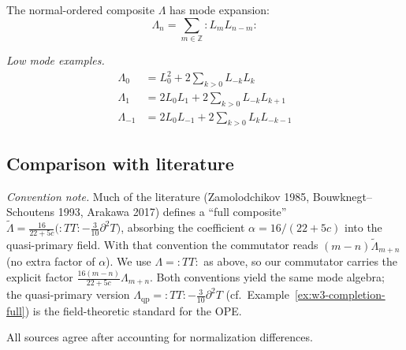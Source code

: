 The normal-ordered composite $\Lambda$ has mode expansion:
\[\Lambda_n = \sum_{m \in \mathbb{Z}} :L_m L_{n-m}:\]

\emph{Low mode examples.}
\begin{align}
\Lambda_0 &= L_0^2 + 2\sum_{k>0} L_{-k}L_k \\
\Lambda_1 &= 2L_0 L_1 + 2\sum_{k>0} L_{-k}L_{k+1} \\
\Lambda_{-1} &= 2L_0 L_{-1} + 2\sum_{k>0} L_k L_{-k-1}
\end{align}

\subsection{Comparison with literature}

\emph{Convention note.} Much of the literature (Zamolodchikov 1985, Bouwknegt--Schoutens 1993, Arakawa 2017) defines a ``full composite'' $\widetilde{\Lambda} = \frac{16}{22+5c}\bigl({:}TT{:} - \frac{3}{10}\partial^2 T\bigr)$, absorbing the coefficient $\alpha = 16/(22+5c)$ into the quasi-primary field. With that convention the commutator reads $(m-n)\widetilde{\Lambda}_{m+n}$ (no extra factor of $\alpha$). We use $\Lambda = {:}TT{:}$ as above, so our commutator carries the explicit factor $\frac{16(m-n)}{22+5c}\Lambda_{m+n}$. Both conventions yield the same mode algebra; the quasi-primary version $\Lambda_{\mathrm{qp}} = {:}TT{:} - \frac{3}{10}\partial^2 T$ (cf.\ Example~\ref{ex:w3-completion-full}) is the field-theoretic standard for the OPE.

All sources agree after accounting for normalization differences.
